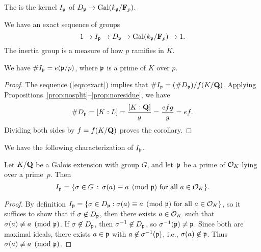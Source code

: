 \begin{definition}
The  is the kernel $I_{\mathfrak{p}}$ of $D_{\mathfrak{p}}\to\operatorname{Gal}(k_{\mathfrak{p}}/\mathbf{F}_p)$.
\end{definition}
We have an exact sequence of groups
\begin{equation}\label{eqn:exact}
   1 \to I_{\mathfrak{p}} \to D_{\mathfrak{p}} \to \operatorname{Gal}(k_{\mathfrak{p}}/\mathbf{F}_p)\to 1.
\end{equation}
The inertia group is a measure of how $p$ ramifies in $K$.
\begin{corollary}
We have $\# I_{\mathfrak{p}}= e(\mathfrak{p}/p)$, where $\mathfrak{p}$ is a prime of $K$ over $p$.
\end{corollary}
\begin{proof}
The sequence (\ref{eqn:exact}) implies that 
$\#I_{\mathfrak{p}} = (\#D_{\mathfrak{p}})/f(K/\mathbf{Q})$.  Applying Propositions~\ref{prop:nosplit}--\ref{prop:noresidue}, we have
$$\#D_{\mathfrak{p}} = [K:L] = \frac{[K:\mathbf{Q}]}{g} = \frac{efg}{g} = ef.$$
Dividing both sides by $f=f(K/\mathbf{Q})$ proves the corollary.
\end{proof}

We have the following characterization of $I_{\mathfrak{p}}$.
\begin{proposition}\label{prop:charip}
Let $K/\mathbf{Q}$ be a Galois extension with group $G$, 
and let~$\mathfrak{p}$ be a prime of $\mathcal{O}_K$ lying
over a prime~$p$.  Then 
$$
I_{\mathfrak{p}} = \{\sigma\in G \, :\, \sigma(a) \equiv a\pmod{\mathfrak{p}}\text{ for all } a\in\mathcal{O}_K\}.
$$
\end{proposition}
\begin{proof}
  By definition $I_{\mathfrak{p}} = \{\sigma\in D_{\mathfrak{p}} : \sigma(a) \equiv
  a\pmod{\mathfrak{p}}\text{ for all } a\in\mathcal{O}_K\}$, so it suffices to show that
  if $\sigma\not\in D_{\mathfrak{p}}$, then there exists $a\in\mathcal{O}_K$ such that
  $\sigma(a)\not\equiv a\pmod{\mathfrak{p}}$.  If $\sigma\not\in D_{\mathfrak{p}}$, then
  $\sigma^{-1}\not\in D_{\mathfrak{p}}$, so $\sigma^{-1}(\mathfrak{p})\neq \mathfrak{p}$.  Since both
  are maximal ideals, there exists $a\in\mathfrak{p}$ with
  $a\not\in\sigma^{-1}(\mathfrak{p})$, i.e., $\sigma(a)\not\in\mathfrak{p}$.  Thus
  $\sigma(a)\not\equiv a\pmod{\mathfrak{p}}$.
\end{proof}



